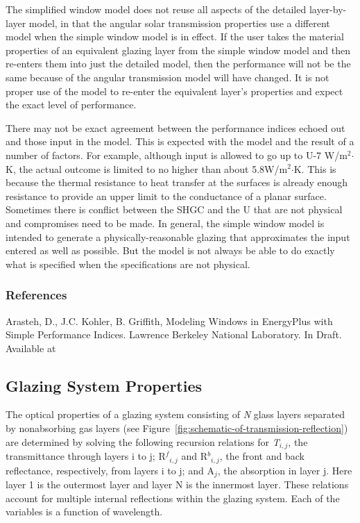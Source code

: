 The simplified window model does not reuse all aspects of the detailed layer-by-layer model, in that the angular solar transmission properties use a different model when the simple window model is in effect. If the user takes the material properties of an equivalent glazing layer from the simple window model and then re-enters them into just the detailed model, then the performance will not be the same because of the angular transmission model will have changed. It is not proper use of the model to re-enter the equivalent layer's properties and expect the exact level of performance.

There may not be exact agreement between the performance indices echoed out and those input in the model. This is expected with the model and the result of a number of factors. For example, although input is allowed to go up to U-7 W/m\(^{2}\)\(\cdot\)K, the actual outcome is limited to no higher than about 5.8W/m\(^{2}\)\(\cdot\)K. This is because the thermal resistance to heat transfer at the surfaces is already enough resistance to provide an upper limit to the conductance of a planar surface. Sometimes there is conflict between the SHGC and the U that are not physical and compromises need to be made. In general, the simple window model is intended to generate a physically-reasonable glazing that approximates the input entered as well as possible. But the model is not always be able to do exactly what is specified when the specifications are not physical.

\subsubsection{References}\label{references-054}

Arasteh, D., J.C. Kohler, B. Griffith, Modeling Windows in EnergyPlus with Simple Performance Indices. Lawrence Berkeley National Laboratory. In Draft. Available at

\subsection{Glazing System Properties}\label{glazing-system-properties}

The optical properties of a glazing system consisting of \emph{N} glass layers separated by nonabsorbing gas layers (see Figure~\ref{fig:schematic-of-transmission-reflection}) are determined by solving the following recursion relations for \emph{T\(_{i,j}\)}, the transmittance through layers i to j; {R\(^{f}\)\(_{i,j}\)} and {R\(^{b}\)\(_{i,j}\)}, the front and back reflectance, respectively, from layers i to j; and A\(_{j}\), the absorption in layer j. Here layer 1 is the outermost layer and layer N is the innermost layer. These relations account for multiple internal reflections within the glazing system. Each of the variables is a function of wavelength.

